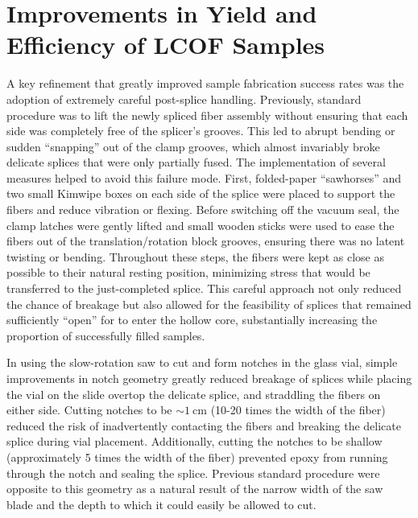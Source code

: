 \section{Improvements in Yield and Efficiency of \acs{LCOF} Samples}
\label{Cooling:Appendix:sec:ImprovementsinYieldandEfficiencyofLCOFSamples}

A key refinement that greatly improved sample fabrication success rates was the adoption of extremely careful post-splice handling. Previously, standard procedure was to lift the newly spliced fiber assembly without ensuring that each side was completely free of the splicer’s grooves. This led to abrupt bending or sudden “snapping” out of the clamp grooves, which almost invariably broke delicate splices that were only partially fused. The implementation of several measures helped to avoid this failure mode. First, folded-paper “sawhorses” and two small Kimwipe boxes on each side of the splice were placed to support the fibers and reduce vibration or flexing. Before switching off the vacuum seal, the clamp latches were gently lifted and small wooden sticks were used to ease the fibers out of the translation/rotation block grooves, ensuring there was no latent twisting or bending. Throughout these steps, the fibers were kept as close as possible to their natural resting position, minimizing stress that would be transferred to the just-completed splice. This careful approach not only reduced the chance of breakage but also allowed for the feasibility of splices that remained sufficiently “open” for  to enter the hollow core, substantially increasing the proportion of successfully filled samples.

In using the slow-rotation saw to cut and form notches in the glass vial, simple improvements in notch geometry greatly reduced breakage of splices while placing the vial on the slide overtop the delicate splice, and straddling the fibers on either side. Cutting notches to be \(\sim\SI{1}{\centi\meter}\) (10-20 times the width of the fiber) reduced the risk of inadvertently contacting the fibers and breaking the delicate splice during vial placement. Additionally, cutting the notches to be shallow (approximately 5 times the width of the fiber) prevented epoxy from running through the notch and sealing the splice. Previous standard procedure were opposite to this geometry as a natural result of the narrow width of the saw blade and the depth to which it could easily be allowed to cut.

